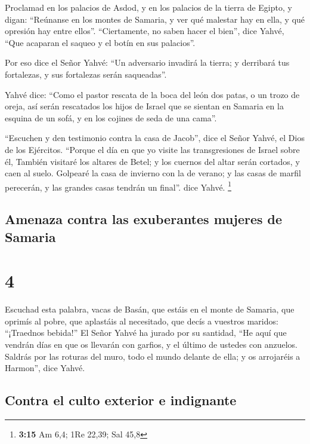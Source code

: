  Proclamad en los palacios de Asdod, y en los palacios de
la tierra de Egipto, y digan: ``Reúnanse en los montes de Samaria, y ver
qué malestar hay en ella, y qué opresión hay entre ellos''.
 ``Ciertamente, no saben hacer el bien'', dice Yahvé,
``Que acaparan el saqueo y el botín en sus palacios''.

 Por eso dice el Señor Yahvé: ``Un adversario invadirá la
tierra; y derribará tus fortalezas, y sus fortalezas serán saqueadas''.

 Yahvé dice: ``Como el pastor rescata de la boca del león
dos patas, o un trozo de oreja, así serán rescatados los hijos de Israel
que se sientan en Samaria en la esquina de un sofá, y en los cojines de
seda de una cama''.

 ``Escuchen y den testimonio contra la casa de Jacob'',
dice el Señor Yahvé, el Dios de los Ejércitos.  ``Porque
el día en que yo visite las transgresiones de Israel sobre él, También
visitaré los altares de Betel; y los cuernos del altar serán cortados, y
caen al suelo.  Golpearé la casa de invierno con la de
verano; y las casas de marfil perecerán, y las grandes casas tendrán un
final''. dice Yahvé. \footnote{\textbf{3:15} Am 6,4; 1Re 22,39; Sal 45,8}

\hypertarget{amenaza-contra-las-exuberantes-mujeres-de-samaria}{%
\subsection{Amenaza contra las exuberantes mujeres de
Samaria}\label{amenaza-contra-las-exuberantes-mujeres-de-samaria}}

\hypertarget{section-3}{%
\section{4}\label{section-3}}

 Escuchad esta palabra, vacas de Basán, que estáis en el
monte de Samaria, que oprimís al pobre, que aplastáis al necesitado, que
decís a vuestros maridos: ``¡Traednos bebida!''  El Señor
Yahvé ha jurado por su santidad, ``He aquí que vendrán días en que os
llevarán con garfios, y el último de ustedes con anzuelos.
 Saldrás por las roturas del muro, todo el mundo delante
de ella; y os arrojaréis a Harmon'', dice Yahvé.

\hypertarget{contra-el-culto-exterior-e-indignante}{%
\subsection{Contra el culto exterior e
indignante}\label{contra-el-culto-exterior-e-indignante}}

